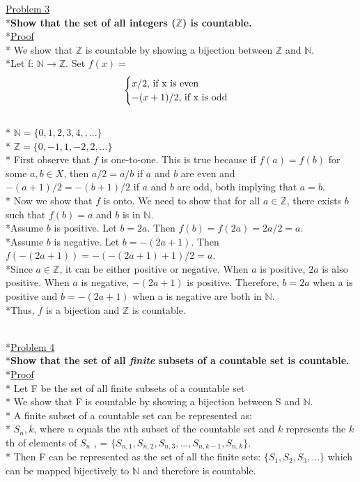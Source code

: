 \documentclass[12pt]{article}
\begin{document}
\noindent
\uline{Problem 3}
\\*\textbf{Show that the set of all integers ($\mathbb{Z}$) is countable.}
\bigskip
\\*\uline{Proof}
\\* We show that $\mathbb{Z}$ is countable by showing a bijection between $\mathbb{Z}$ and $\mathbb{N}$.
\bigskip
\\*Let f: $\mathbb{N} \rightarrow \mathbb{Z}$.
Set $f(x) =$ \[ \begin{cases}
			x/2$, if x is even$ \\
			-(x+1)/2$, if x is odd$ \\
		\end{cases}
		\]
\\* $\mathbb{N} = \{0, 1, 2, 3, 4, ,...\}$
\\* $\mathbb{Z} = \{0, -1, 1, -2, 2, ...\}$
\\* First observe that $f$ is one-to-one. This is true because if $f(a) = f(b)$ for some $a,b \in X$, then $a/2 = a/b$ if $a$ and $b$ are even and $-(a+1)/2 = -(b+1)/2$ if $a$ and $b$ are odd, both implying that $a = b$.
\bigskip
\\* Now we show that $f$ is onto. We need to show that for all $a \in \mathbb{Z}$, there exists $b$ such that $f(b) = a$ and $b$ is in $\mathbb{N}$. 
\\*Assume $b$ is positive. Let $b = 2a$. Then $f(b) = f(2a) = 2a/2 = a$. 
\\*Assume $b$ is negative. Let $b = -(2a + 1)$. Then $f(-(2a + 1)) = -(-(2a + 1) + 1)/2 = a$. 
\\*Since $a \in \mathbb{Z}$, it can be either positive or negative. When $a$ is positive, $2a$ is also positive. When $a$ is negative, $-(2a + 1)$ is positive. Therefore, $b = 2a$ when a is positive and $b = -(2a + 1)$ when a is negative are both in $\mathbb{N}$.
\bigskip
\\*Thus, $f$ is a bijection and $\mathbb{Z}$ is countable. 
\bigskip



\noindent
\\*\uline{Problem 4}
\\*\textbf{Show that the set of all \textit{finite} subsets of a countable set is countable.}
\smallskip
\\*\uline{Proof}
\\* Let F be the set of all finite subsets of a countable set 
\\* We show that F is countable by showing a bijection between S and $\mathbb{N}$.
\bigskip
\\* A finite subset of a countable set can be represented as:
\\* $S_n, k$, where $n$ equals the $n$th subset of the countable set and $k$ represents the $k$th of elements of $S_n$ , = $\{S_{n,1}, S_{n,2}, S_{n,3},...,S_{n, k-1}, S_{n, k}\}$. 
\\* Then F can be represented as the set of all the finite sets: $\{S_1, S_2, S_3, ...\}$ which can be mapped bijectively to $\mathbb{N}$ and therefore is countable.
\medskip
\end{document}
